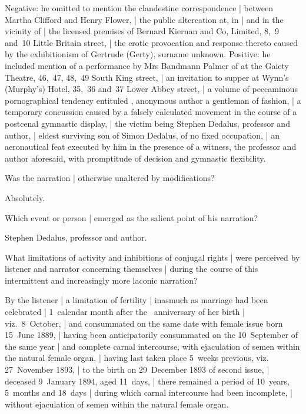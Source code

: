 \Memories
Negative:
he omitted to mention the clandestine correspondence |
between Martha Clifford and Henry Flower, |
the public altercation at, in |
and in the vicinity of |
the licensed premises of Bernard Kiernan and Co, Limited,
8,~9 and~10 Little Britain street, |
the erotic provocation and response thereto
caused by the exhibitionism of Gertrude (Gerty),
surname unknown.
Positive:
he included mention of a performance by Mrs Bandmann Palmer of 
at the Gaiety Theatre, 46,~47, 48,~49 South King street, |
an invitation to supper at Wynn's (Murphy's) Hotel,
35,~36 and~37 Lower Abbey street, |
a volume of peccaminous pornographical tendency entituled ,
anonymous author a gentleman of fashion, |
a temporary concussion caused by a falsely calculated movement
in the course of a postcenal gymnastic display, |
the victim
being Stephen Dedalus, professor and author, |
eldest surviving son of Simon Dedalus,
of no fixed occupation, |
an aeronautical feat executed by him
in the presence of a witness,
the professor and author aforesaid,
with promptitude of decision and gymnastic flexibility.


Was the narration |
otherwise unaltered by modifications?

\Factual[~(legal)]
Absolutely.


Which event or person |
emerged as the salient point of his narration?

\Poetry[~(emotion)]
Stephen Dedalus,
professor and author.


What limitations of activity and inhibitions of conjugal rights |
were perceived by listener and narrator concerning themselves |
during the course of this intermittent and increasingly more laconic narration?

\Molly
By the listener |
a limitation of fertility |
inasmuch as marriage had been celebrated |
1~calendar month after the ~anniversary of her birth
 |
viz.\ 8~October, |
and consummated on the same date with female issue born 15~June 1889, |
having been anticipatorily consummated on the 10~September of the same year |
and complete carnal intercourse,
with ejaculation of semen within the natural female organ, |
having last taken place 5~weeks previous,
viz. 27~November 1893, |
to the birth on 29~December 1893 of second
issue, |
deceased 9~January 1894, aged 11~days, |
there remained a period of 10~years, 5~months and 18~days |
during which carnal intercourse had been incomplete, |
without ejaculation of semen within the natural female organ.

